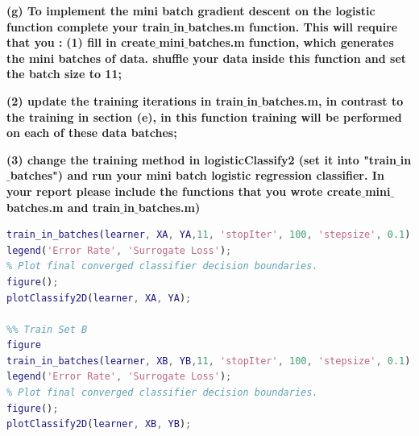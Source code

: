 \documentclass[]{scrreprt}   %
\begin{document}


\bigbreak
\textbf{(g) To implement the mini batch gradient descent on the logistic function complete your train$\_$in$\_$batches.m function. This will require that you :}
\smallbreak
\textbf{(1) fill in create$\_$mini$\_$batches.m function, which generates the mini batches of data. shuffle your data inside this function and set the batch size to 11;}


\bigbreak
\textbf{(2) update the training iterations in train$\_$in$\_$batches.m, in contrast to the training in section (e), in this function training will be performed on each of these data batches;}

\bigbreak
\textbf{(3) change the training method in logisticClassify2 (set it into "train$\_$in$\_$batches") and run your mini batch logistic regression classifier. In your report please include the functions that you wrote create$\_$mini$\_$batches.m and train$\_$in$\_$batches.m)}
\begin{lstlisting}[language=Matlab]
% Train Set A
train_in_batches(learner, XA, YA,11, 'stopIter', 100, 'stepsize', 0.1);
legend('Error Rate', 'Surrogate Loss');
% Plot final converged classifier decision boundaries.
figure();
plotClassify2D(learner, XA, YA);

%% Train Set B
figure
train_in_batches(learner, XB, YB,11, 'stopIter', 100, 'stepsize', 0.1);
legend('Error Rate', 'Surrogate Loss');
% Plot final converged classifier decision boundaries.
figure();
plotClassify2D(learner, XB, YB);
\end{lstlisting}
\end{document}
